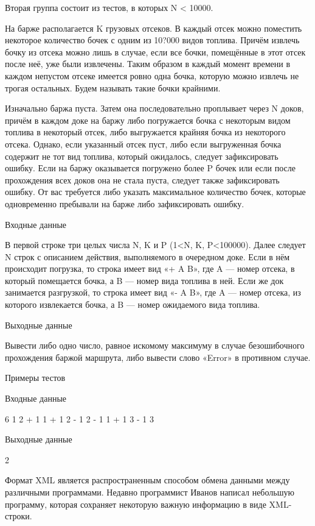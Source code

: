 \documentclass[]{article}
\begin{document}
\begin{enumerate}
Вторая группа состоит из тестов, в которых N < 10000.



На барже располагается K грузовых отсеков. В каждый отсек можно поместить некоторое количество бочек с одним из 10?000 видов топлива. Причём извлечь бочку из отсека можно лишь в случае, если все бочки, помещённые в этот отсек после неё, уже были извлечены. Таким образом в каждый момент времени в каждом непустом отсеке имеется ровно одна бочка, которую можно извлечь не трогая остальных. Будем называть такие бочки крайними.

Изначально баржа пуста. Затем она последовательно проплывает через N доков, причём в каждом доке на баржу либо погружается бочка с некоторым видом топлива в некоторый отсек, либо выгружается крайняя бочка из некоторого отсека. Однако, если указанный отсек пуст, либо если выгруженная бочка содержит не тот вид топлива, который ожидалось, следует зафиксировать ошибку. Если на баржу оказывается погружено более P бочек или если после прохождения всех доков она не стала пуста, следует также зафиксировать ошибку. От вас требуется либо указать максимальное количество бочек, которые одновременно пребывали на барже либо зафиксировать ошибку.

Входные данные

В первой строке три целых числа N, K и P (1<N, K, P<100000). Далее следует N строк с описанием действия, выполняемого в очередном доке. Если в нём происходит погрузка, то строка имеет вид «+ A B», где A — номер отсека, в который помещается бочка, а B — номер вида топлива в ней. Если же док занимается разгрузкой, то строка имеет вид «- A B», где A — номер отсека, из которого извлекается бочка, а B — номер ожидаемого вида топлива.

Выходные данные

Вывести либо одно число, равное искомому максимуму в случае безошибочного прохождения баржой маршрута, либо вывести слово «Error» в противном случае.

Примеры тестов

Входные данные

6 1 2
+ 1 1
+ 1 2
- 1 2
- 1 1
+ 1 3
- 1 3

Выходные данные

2


 Формат XML является распространенным способом обмена данными между различными программами. Недавно программист Иванов написал небольшую программу, которая сохраняет некоторую важную информацию в виде XML-строки.


\end{enumerate}
\end{document}
